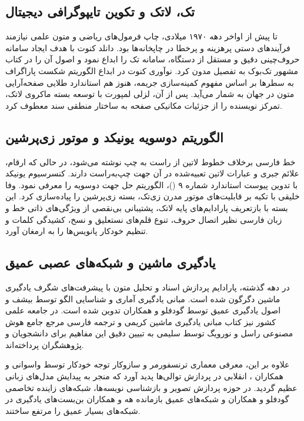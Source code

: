 \subsection{تک، لاتک و تکوین تایپوگرافی دیجیتال}
تا پیش از اواخر دهه ۱۹۷۰ میلادی، چاپ فرمول‌های ریاضی و متون علمی نیازمند فرآیندهای دستی پرهزینه و پرخطا در چاپخانه‌ها بود. دانلد کنوت با هدف ایجاد سامانه حروف‌چینی دقیق و مستقل از دستگاه، سامانه تک را ابداع نمود و اصول آن را در کتاب مشهور تک‌بوک \cite{knuth1984texbook} به تفصیل مدون کرد. نوآوری کنوت در ابداع الگوریتم شکست پاراگراف به سطرها بر اساس مفهوم کمینه‌سازی جریمه، هنوز هم استاندارد طلایی صفحه‌آرایی متون در جهان به شمار می‌آید. پس از آن، لزلی لمپورت با توسعه بسته ماکروی لاتک، تمرکز نویسنده را از جزئیات مکانیکی صفحه به ساختار منطقی سند معطوف کرد.

\subsection{الگوریتم دوسویه یونیکد و موتور زی‌پرشین}
خط فارسی برخلاف خطوط لاتین از راست به چپ نوشته می‌شود، در حالی که ارقام، علائم جبری و عبارات لاتین تعبیه‌شده در آن جهت چپ‌به‌راست دارند. کنسرسیوم یونیکد \cite{unicode2024standard} با تدوین پیوست استاندارد شماره ۹ ()، الگوریتم حل جهت دوسویه را معرفی نمود. وفا خلیقی \cite{khalighi2020xepersian} با تکیه بر قابلیت‌های موتور مدرن زی‌تک، بسته زی‌پرشین را پیاده‌سازی کرد. این بسته با بازتعریف پارادایم‌های پایه لاتک، پشتیبانی بی‌نقصی از ویژگی‌های ذاتی خط و زبان فارسی نظیر اتصال حروف، تنوع قلم‌های نستعلیق و نسخ، کشیدگی کلمات و تنظیم خودکار پانویس‌ها را به ارمغان آورد.

\subsection{یادگیری ماشین و شبکه‌های عصبی عمیق}
در دهه گذشته، پارادایم پردازش اسناد و تحلیل متون با پیشرفت‌های شگرف یادگیری ماشین دگرگون شده است. مبانی یادگیری آماری و شناسایی الگو توسط بیشف \cite{bishop2006pattern} و اصول یادگیری عمیق توسط گودفلو و همکاران \cite{goodfellow2016deep} تدوین شده است. در جامعه علمی کشور نیز کتاب مبانی یادگیری ماشین کریمی \cite{karimi1398} و ترجمه فارسی مرجع جامع هوش مصنوعی راسل و نورویگ توسط سلیمی \cite{salimi1400translation} به تبیین دقیق این مفاهیم برای دانشجویان و پژوهشگران پرداخته‌اند.

علاوه بر این، معرفی معماری ترنسفورمر و سازوکار توجه خودکار توسط واسوانی و همکاران \cite{vaswani2017attention}، انقلابی در پردازش توالی‌ها پدید آورد که منجر به پیدایش مدل‌های زبانی عظیم گردید. در حوزه پردازش تصویر و بازشناسی نویسه‌ها، شبکه‌های زاینده تخاصمی گودفلو و همکاران \cite{goodfellow2014generative} و شبکه‌های عمیق بازمانده هه و همکاران \cite{he2016deep} بن‌بست‌های یادگیری در شبکه‌های بسیار عمیق را مرتفع ساختند.

